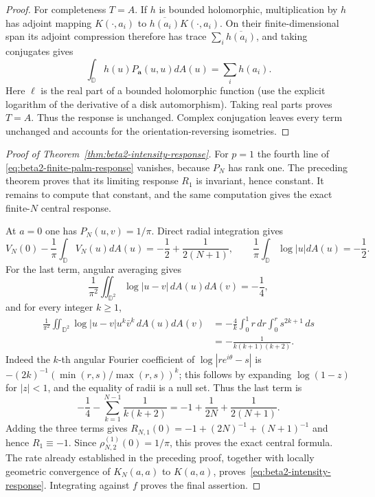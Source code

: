 \documentclass[11pt,a4paper]{article}
\numberwithin{equation}{section}
\theoremstyle{definition}
\theoremstyle{remark}
\newcommand{\D}{\mathbb D}
\begin{document}
\begin{proof}
For completeness $T=A$.  If $h$ is bounded holomorphic, multiplication
by $h$ has adjoint mapping $K(\cdot,a_i)$ to
$\overline{h(a_i)}K(\cdot,a_i)$.  On their finite-dimensional span
its adjoint compression therefore has trace
$\sum_i\overline{h(a_i)}$, and taking conjugates gives
\[
 \int_\D h(u)P_{\mathbf a}(u,u)dA(u)=\sum_i h(a_i).
\]
Here $\ell$ is the real part of a bounded holomorphic function
(use the explicit logarithm of the derivative of a disk
automorphism).  Taking real parts proves $T=A$.  Thus the response
is unchanged.  Complex conjugation leaves every term unchanged and
accounts for the orientation-reversing isometries.
\end{proof}

\begin{proof}[Proof of Theorem~\ref{thm:beta2-intensity-response}]
For $p=1$ the fourth line of
\eqref{eq:beta2-finite-palm-response} vanishes, because $P_N$ has
rank one.  The preceding theorem proves that its limiting response
$R_1$ is invariant, hence constant.  It remains to compute that
constant, and the same computation gives the exact finite-$N$
central response.

At $a=0$ one has $P_N(u,v)=1/\pi$.  Direct radial integration gives
\[
 V_N(0)-\frac1\pi\int_\D V_N(u)dA(u)
 =-\frac12+\frac1{2(N+1)},\qquad
 \frac1\pi\int_\D\log|u|dA(u)=-\frac12.
\]
For the last term, angular averaging gives
\[
 \frac1{\pi^2}\iint_{\D^2}\log|u-v|\,dA(u)dA(v)=-\frac14,
\]
and for every integer $k\ge1$,
\begin{align*}
 \frac1{\pi^2}\iint_{\D^2}
       \log|u-v|u^k\bar v^k\,dA(u)dA(v)
 &=-\frac4k\int_0^1r\,dr\int_0^r s^{2k+1}\,ds\\
 &=-\frac1{k(k+1)(k+2)}.
\end{align*}
Indeed the $k$-th angular Fourier coefficient of
$\log|re^{i\theta}-s|$ is
$-(2k)^{-1}(\min(r,s)/\max(r,s))^k$; this follows by expanding
$\log(1-z)$ for $|z|<1$, and the equality of radii is a null set.
Thus the last term is
\[
 -\frac14-\sum_{k=1}^{N-1}\frac1{k(k+2)}
 =-1+\frac1{2N}+\frac1{2(N+1)}.
\]
Adding the three terms gives
$R_{N,1}(0)=-1+(2N)^{-1}+(N+1)^{-1}$ and hence $R_1\equiv-1$.
Since $\rho_{N,2}^{(1)}(0)=1/\pi$, this proves the exact central
formula.  The rate already established in the preceding proof,
together with locally geometric convergence of $K_N(a,a)$ to
$K(a,a)$, proves~\eqref{eq:beta2-intensity-response}.  Integrating
against $f$ proves the final assertion.
\end{proof}
\end{document}
